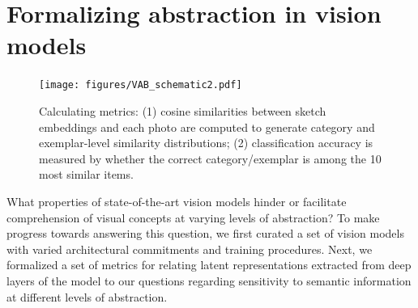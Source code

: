 \documentclass[10pt,letterpaper]{article}
\begin{document}
\section{Formalizing abstraction in vision models}
\begin{figure}[ht!]
    \centering
    \texttt{[image: figures/VAB\_schematic2.pdf]}
     \vspace{-1em}
    \caption{Calculating metrics: (1) cosine similarities between sketch embeddings and each photo are computed to generate category and exemplar-level similarity distributions; (2) classification accuracy is measured by whether the correct category/exemplar is among the 10 most similar items.
    }
    \vspace{-1em}
    \label{fig:_}
    \vspace{-0.5em}
\end{figure}

What properties of state-of-the-art vision models hinder or facilitate comprehension of visual concepts at varying levels of abstraction? 
To make progress towards answering this question, we first curated a set of vision models with varied architectural commitments and training procedures. 
Next, we formalized a set of metrics for relating latent representations extracted from deep layers of the model to our questions regarding sensitivity to semantic information at different levels of abstraction.


\end{document}
